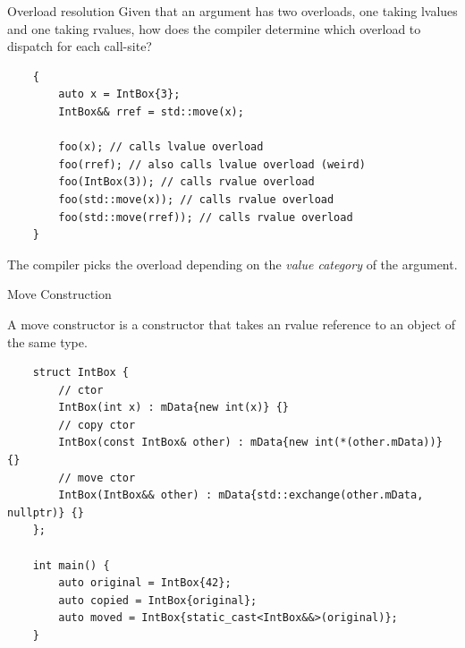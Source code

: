 \begin{frame}[fragile]{Overload resolution}
  Given that an argument has two overloads, one taking lvalues and one taking rvalues,
  how does the compiler determine which overload to dispatch for each call-site?

  \begin{verbatim}
    {
        auto x = IntBox{3};
        IntBox&& rref = std::move(x);

        foo(x); // calls lvalue overload
        foo(rref); // also calls lvalue overload (weird)
        foo(IntBox(3)); // calls rvalue overload
        foo(std::move(x)); // calls rvalue overload
        foo(std::move(rref)); // calls rvalue overload
    }
  \end{verbatim}

  \begin{sqt:result}
    The compiler picks the overload depending on the \emph{value category} of the argument.
  \end{sqt:result}
\end{frame}

\begin{frame}[fragile]{Move Construction}
  \begin{sqt:definition}
    A move constructor is a constructor that takes an rvalue reference
    to an object of the same type.
  \end{sqt:definition}

  \begin{verbatim}
    struct IntBox {
        // ctor 
        IntBox(int x) : mData{new int(x)} {}
        // copy ctor
        IntBox(const IntBox& other) : mData{new int(*(other.mData))} {}
        // move ctor
        IntBox(IntBox&& other) : mData{std::exchange(other.mData, nullptr)} {}
    };

    int main() {
        auto original = IntBox{42};
        auto copied = IntBox{original};
        auto moved = IntBox{static_cast<IntBox&&>(original)};
    }
  \end{verbatim}
\end{frame}

